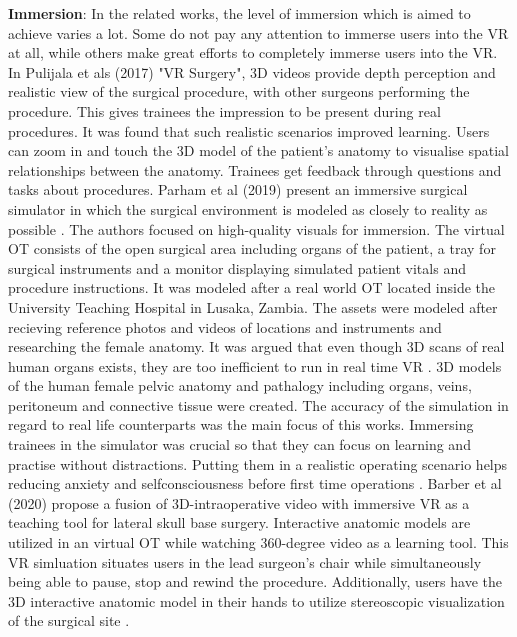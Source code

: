 \textbf{Immersion}: In the related works, the level of immersion which is aimed to achieve varies a lot.
Some do not pay any attention to immerse users into the VR at all, while others make great efforts to completely immerse users into the VR.
\newline
In Pulijala et als (2017) "VR Surgery", 3D videos provide depth perception and realistic view of the surgical procedure, with other surgeons performing the procedure.
This gives trainees the impression to be present during real procedures.
It was found that such realistic scenarios improved learning.
Users can zoom in and touch the 3D model of the patient's anatomy to visualise spatial relationships between the anatomy.
Trainees get feedback through questions and tasks about procedures.
\newline
Parham et al (2019) present an immersive surgical simulator in which the surgical environment is modeled as closely to reality as possible \cite{Parham.2019}.
The authors focused on high-quality visuals for immersion.
The virtual OT consists of the open surgical area including organs of the patient, a tray for surgical instruments and a monitor displaying simulated patient vitals and procedure instructions.
It was modeled after a real world OT located inside the University Teaching Hospital in Lusaka, Zambia.
The assets were modeled after recieving reference photos and videos of locations and instruments and researching the female anatomy.
It was argued that even though 3D scans of real human organs exists, they are too inefficient to run in real time VR \cite{RN52}.
3D models of the human female pelvic anatomy and pathalogy including organs, veins, peritoneum and connective tissue were created.
The accuracy of the simulation in regard to real life counterparts was the main focus of this works.
Immersing trainees in the simulator was crucial so that they can focus on learning and practise without distractions.
Putting them in a realistic operating scenario helps reducing anxiety and selfconsciousness before first time operations \cite{Parham.2019}.
\newline
Barber et al (2020) propose a fusion of 3D-intraoperative video with immersive VR as a teaching tool for lateral skull base surgery.
Interactive anatomic models are utilized in an virtual OT while watching 360-degree video as a learning tool.
This VR simluation situates users in the lead surgeon's chair while simultaneously being able to pause, stop and rewind the procedure.
Additionally, users have the 3D interactive anatomic model in their hands to utilize stereoscopic visualization of the surgical site \cite{Barber.2020}.
